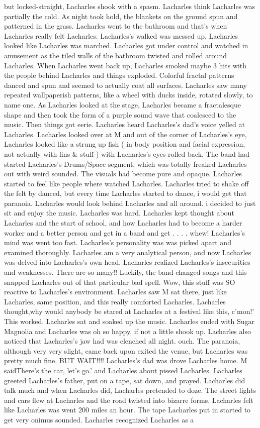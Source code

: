 \documentclass[12pt]{book}
\begin{document}
but locked-straight, Lacharles shook with a spasm. Lacharles think Lacharles was partially the cold. As night took hold, the blankets on the ground spun and patterned in the grass. Lacharles went to the bathroom and that's when Lacharles really felt Lacharles. Lacharles's walked was messed up, Lacharles looked like Lacharles was marched. Lacharles got under control and watched in amusement as the tiled walls of the bathroom twisted and rolled around Lacharles. When Lacharles went back up, Lacharles smoked maybe 3 hits with the people behind Lacharles and things exploded. Colorful fractal patterns danced and spun and seemed to actually coat all surfaces. Lacharles saw many repeated wallpaperish patterns, like a wheel with ducks inside, rotated slowly, to name one. As Lacharles looked at the stage, Lacharles became a fractalesque shape and then took the form of a purple sound wave that coalesced to the music. Then things got eerie. Lacharles heard Lacharles's dad's voice yelled at Lacharles. Lacharles looked over at M and out of the corner of Lacharles's eye, Lacharles looked like a strung up fish ( in body position and facial expression, not actually with fins \& stuff ) with Lacharles's eyes rolled back. The band had started Lacharles's Drums/Space segment, which was totally freaked Lacharles out with weird sounded. The visuals had become pure and opaque. Lacharles started to feel like people where watched Lacharles. Lacharles tried to shake off the felt by danced, but every time Lacharles started to dance, i would get that paranoia. Lacharles would look behind Lacharles and all around. i decided to just sit and enjoy the music. Lacharles was hard. Lacharles kept thought about Lacharles and the start of school, and how Lacharles had to become a harder worker and a better person and get in a band and get  . . .  . whew! Lacharles's mind was went too fast. Lacharles's personality was was picked apart and examined thoroughly. Lacharles am a very analytical person, and now Lacharles was delved into Lacharles's own head. Lacharles realized Lacharles's insecurities and weaknesses. There are so many!! Luckily, the band changed songs and this snapped Lacharles out of that particular bad spell. Wow, this stuff was SO reactive to Lacharles's environment. Lacharles saw M sat there, just like Lacharles, same position, and this really comforted Lacharles. Lacharles thought,why would anybody be stared at Lacharles at a festival like this, c'mon!' This worked. Lacharles sat and soaked up the music. Lacharles ended with Sugar Magnolia and Lacharles was oh so happy, if not a little shook up. Lacharles also noticed that Lacharles's jaw had was clenched all night. ouch. The paranoia, although very very slight, came back upon exited the venue, but Lacharles was pretty much fine. BUT WAIT!!!! Lacharles's dad was drove Lacharles home. M saidThere's the car, let's go.' and Lacharles about pissed Lacharles. Lacharles greeted Lacharles's father, put on a tape, sat down, and prayed. Lacharles did talk much and when Lacharles did, Lacharles pretended to doze. The street lights and cars flew at Lacharles and the road twisted into bizarre forms. Lacharles felt like Lacharles was went 200 miles an hour. The tape Lacharles put in started to get very onimus sounded. Lacharles recognized Lacharles as a 
\end{document}
